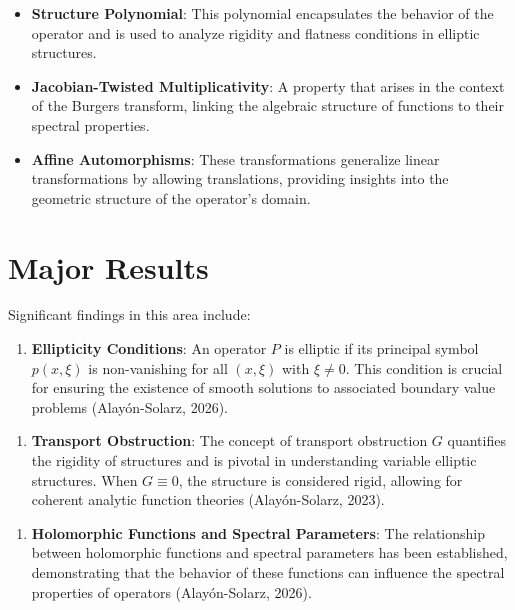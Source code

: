 \documentclass[11pt,a4paper]{article}
\begin{document}
\begin{itemize}
\item \textbf{Structure Polynomial}: This polynomial encapsulates the behavior of the operator and is used to analyze rigidity and flatness conditions in elliptic structures.
\end{itemize}

\begin{itemize}
\item \textbf{Jacobian-Twisted Multiplicativity}: A property that arises in the context of the Burgers transform, linking the algebraic structure of functions to their spectral properties.
\end{itemize}

\begin{itemize}
\item \textbf{Affine Automorphisms}: These transformations generalize linear transformations by allowing translations, providing insights into the geometric structure of the operator's domain.
\end{itemize}

\section{Major Results}
Significant findings in this area include:

\begin{enumerate}
\item \textbf{Ellipticity Conditions}: An operator \( P \) is elliptic if its principal symbol \( p(x, \xi) \) is non-vanishing for all \( (x, \xi) \) with \( \xi \neq 0 \). This condition is crucial for ensuring the existence of smooth solutions to associated boundary value problems (Alayón-Solarz, 2026).
\end{enumerate}

\begin{enumerate}
\item \textbf{Transport Obstruction}: The concept of transport obstruction \( G \) quantifies the rigidity of structures and is pivotal in understanding variable elliptic structures. When \( G \equiv 0 \), the structure is considered rigid, allowing for coherent analytic function theories (Alayón-Solarz, 2023).
\end{enumerate}

\begin{enumerate}
\item \textbf{Holomorphic Functions and Spectral Parameters}: The relationship between holomorphic functions and spectral parameters has been established, demonstrating that the behavior of these functions can influence the spectral properties of operators (Alayón-Solarz, 2026).
\end{enumerate}
\end{document}
